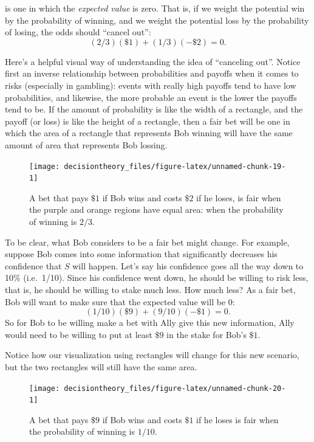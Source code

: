 \documentclass[]{tufte-book}
\begin{document}
 is one in which the \emph{expected value} is zero. That is, if we weight the potential win by the probability of winning, and we weight the potential loss by the probability of losing, the odds should ``cancel out'': \[ (2/3)(\$1) + (1/3)(-\$2) = 0. \]

Here's a helpful visual way of understanding the idea of ``canceling out''. Notice first an inverse relationship between probabilities and payoffs when it comes to risks (especially in gambling): events with really high payoffs tend to have low probabilities, and likewise, the more probable an event is the lower the payoffs tend to be. If the amount of probability is like the width of a rectangle, and the payoff (or loss) is like the height of a rectangle, then a fair bet will be one in which the area of a rectangle that represents Bob winning will have the same amount of area that represents Bob lossing.

\begin{figure}
\texttt{[image: decisiontheory\_files/figure-latex/unnamed-chunk-19-1]} \caption[A bet that pays $\$1$ if Bob wins and costs $\$2$ if he loses, is fair when the purple and orange regions have equal area]{A bet that pays $\$1$ if Bob wins and costs $\$2$ if he loses, is fair when the purple and orange regions have equal area: when the probability of winning is $2/3$.}\label{fig:unnamed-chunk-19}
\end{figure}

To be clear, what Bob considers to be a fair bet might change. For example, suppose Bob comes into some information that significantly decreases his confidence that \(S\) will happen. Let's say his confidence goes all the way down to 10\% (i.e.~1/10). Since his confidence went down, he should be willing to risk less, that is, he should be willing to stake much less. How much less? As a fair bet, Bob will want to make sure that the expected value will be 0: \[ (1/10)(\$9) + (9/10)(-\$1) = 0. \] So for Bob to be willing make a bet with Ally give this new information, Ally would need to be willing to put at least \(\$9\) in the stake for Bob's \(\$1\).

Notice how our visualization using rectangles will change for this new scenario, but the two rectangles will still have the same area.

\begin{figure}
\texttt{[image: decisiontheory\_files/figure-latex/unnamed-chunk-20-1]} \caption[A bet that pays $\$9$ if Bob wins and costs $\$1$ if he loses is fair when the probability of winning is $1/10$]{A bet that pays $\$9$ if Bob wins and costs $\$1$ if he loses is fair when the probability of winning is $1/10$.}\label{fig:unnamed-chunk-20}
\end{figure}
\end{document}
